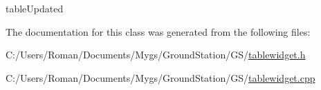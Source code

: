 table\+Updated 



The documentation for this class was generated from the following files\+:\begin{DoxyCompactItemize}
\item 
C\+:/\+Users/\+Roman/\+Documents/\+Mygs/\+Ground\+Station/\+G\+S/\hyperlink{tablewidget_8h}{tablewidget.\+h}\item 
C\+:/\+Users/\+Roman/\+Documents/\+Mygs/\+Ground\+Station/\+G\+S/\hyperlink{tablewidget_8cpp}{tablewidget.\+cpp}\end{DoxyCompactItemize}
